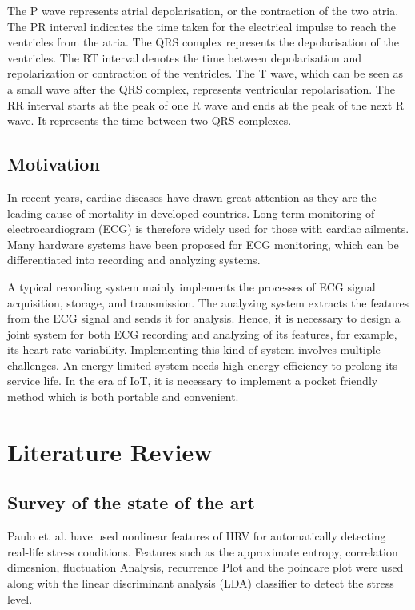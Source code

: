 \documentclass[11pt]{article}
\theoremstyle{definition}
\begin{document}
  The P wave represents atrial depolarisation, or the contraction of the two atria.
  The PR interval indicates the time taken for the electrical impulse to reach the ventricles from the atria.
  The QRS complex represents the depolarisation of the ventricles.
  The RT interval denotes the time between depolarisation and repolarization or contraction of the ventricles.
  The T wave, which can be seen as a small wave after the QRS complex, represents ventricular repolarisation.
  The RR interval starts at the peak of one R wave and ends at the peak of the next R wave. It represents the time between two QRS complexes.

\subsection{Motivation}

  In recent years, cardiac diseases have drawn great attention as they are the leading cause of mortality in developed countries.
  Long term monitoring of electrocardiogram (ECG) is therefore widely used for those with cardiac ailments.
  Many hardware systems have been proposed for ECG monitoring, which can be differentiated into recording and analyzing systems.

  A typical recording system mainly implements the processes of ECG signal acquisition, storage, and transmission.
  The analyzing system extracts the features from the ECG signal and sends it for analysis.
  Hence, it is necessary to design a joint system for both ECG recording and analyzing of its features, for example, its heart rate variability. Implementing this kind of system involves multiple challenges.
  An energy limited system needs high energy efficiency to prolong its service life.
  In the era of IoT, it is necessary to implement a pocket friendly method which is both portable and convenient.


  \section{Literature Review}
  \subsection{Survey of the state of the art}
  Paulo et. al.\cite{melillo2011nonlinear} have used nonlinear features of HRV for automatically detecting real-life stress conditions. Features such as the approximate entropy, correlation dimesnion, fluctuation Analysis, recurrence Plot and the poincare plot were used along with the linear discriminant analysis (LDA) classifier to detect the stress level.
\end{document}
